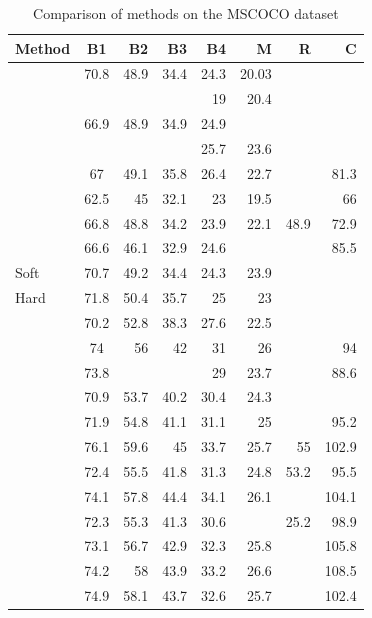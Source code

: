 \clearpage
\begin{table}[ht]
\caption{Comparison of methods on the MSCOCO dataset}
\begin{tabular}{lcrrrrrr}
    \toprule
    Method	&	B1	&	B2	&	B3	&	B4	&	M	&   R   &	C \\
    \midrule
    \citet{Kiros2014_LBL}	&	70.8	&	48.9	&	34.4	&	24.3	&	20.03	&		&		\\
    \citet{Chen2015}	&		&		&		&	19	&	20.4	&		&		\\
    \citet{Donahue2015}	&	66.9	&	48.9	&	34.9	&	24.9	&		&		&		\\
    \citet{Fang2015}	&		&		&		&	25.7	&	23.6	&		&		\\
    \citet{Jia2015}	&	67	&	49.1	&	35.8	&	26.4	&	22.7	&		&	81.3	\\
    \citet{Karpathy2015}	&	62.5	&	45	&	32.1	&	23	&	19.5	&		&	66	\\
    \citet{Mao2015_mRNN}	&	66.8	&	48.8	&	34.2	&	23.9	&	22.1	&	48.9	&	72.9	\\
    \citet{Vinyals2015}	&	66.6	&	46.1	&	32.9	&	24.6	&		&		&	85.5	\\
    \citet{Xu2015} Soft	&	70.7	&	49.2	&	34.4	&	24.3	&	23.9	&		&		\\
    \citet{Xu2015} Hard	&	71.8	&	50.4	&	35.7	&	25	&	23	&		&		\\
    \citet{Oruganti2016}	&	70.2	&	52.8	&	38.3	&	27.6	&	22.5	&		&		\\
    \citet{Wu2016}	&	74	&	56	&	42	&	31	&	26	&		&	94	\\
    \citet{Yang2016_RevNet}	&	73.8	&		&		&	29	&	23.7	&		&	88.6	\\
    \citet{You2016}	&	70.9	&	53.7	&	40.2	&	30.4	&	24.3	&		&		\\
    \citet{Chen2017_SCA}	&	71.9	&	54.8	&	41.1	&	31.1	&	25	&		&	95.2	\\
    \citet{Chen2017_RLSTM}	&	76.1	&	59.6	&	45	&	33.7	&	25.7	&	55	&	102.9	\\
    \citet{Fu2017}	&	72.4	&	55.5	&	41.8	&	31.3	&	24.8	&	53.2	&	95.5	\\
    \citet{Gan2017_SCN}	&	74.1	&	57.8	&	44.4	&	34.1	&	26.1	&		&	104.1	\\
    \citet{Gu2017}	&	72.3	&	55.3	&	41.3	&	30.6	&		&	25.2	&	98.9	\\
    \citet{Liu2017_MAT}	&	73.1	&	56.7	&	42.9	&	32.3	&	25.8	&		&	105.8	\\
    \citet{Lu2017}	&	74.2	&	58	&	43.9	&	33.2	&	26.6	&		&	108.5	\\
    \citet{Mun2017}	&	74.9	&	58.1	&	43.7	&	32.6	&	25.7	&		&	102.4	\\

\end{tabular}
\end{table}
